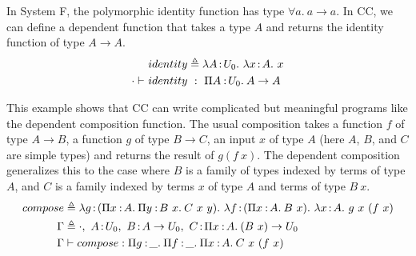 \begin{exmp}
In System F, the polymorphic identity function has type $\forall a.\ a \rightarrow a$. In CC, we can define a  dependent function that takes a type $A$ and returns the identity function of type $A \rightarrow A$.
	\begin{align*}
		&identity \triangleq \lambda A\hspace{0.5mm}{:}\hspace{0.5mm} U_0.\ \lambda x\hspace{0.5mm}{:}\hspace{0.5mm} A.\ x \\
		\cdot \vdash\ &identity\ :\ \Pi A\mkern1.5mu{\hspace{0.5mm}{:}\hspace{0.5mm}} U_0.\hspace{0.8mm}A \rightarrow A
	\end{align*}
\end{exmp}

\begin{exmp}
This example shows that CC can write complicated but meaningful programs like the dependent composition function. The usual composition takes a function $f$ of type $A \rightarrow B$, a function $g$ of type $B \rightarrow C$, an input $x$ of type $A$ (here $A$, $B$, and $C$ are simple types) and returns the result of $g (f\ x)$. The dependent composition generalizes this to the case where $B$ is a family of types indexed by terms of type $A$, and $C$ is a family indexed by terms $x$ of type $A$ and terms of type $B\ x$.
	\begin{align*}
		compose &\triangleq \lam{g}{(\pitype{x}{A}{\pitype{y}{B\ x}{C\ x\ y}})}{\lam{f}{(\pitype{x}{A}{B\ x})}{\lam{x}{A}{g\ x\ (f\ x)}}} \\
		\Gamma &\triangleq \cdot,\ A \goodcolon U_0,\ B \goodcolon A \rightarrow U_0,\ C \goodcolon \pitype{x}{A}{(B\ x) \rightarrow U_0}\\
		\Gamma &\vdash compose \mathrel{:} \pitype{g}{\_}{\pitype{f}{\_}{\pitype{x}{A}{C\ x\ (f\ x)}}} 
	\end{align*}
\end{exmp}


